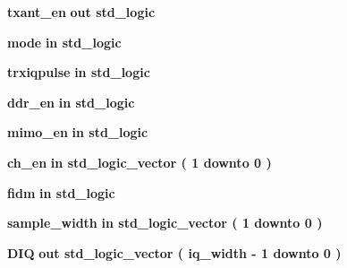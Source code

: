 \begin{DoxyCompactItemize}
\item 
{\bf txant\+\_\+en}  {\bfseries {\bfseries \textcolor{keywordflow}{out}\textcolor{vhdlchar}{ }}} {\bfseries \textcolor{comment}{std\+\_\+logic}\textcolor{vhdlchar}{ }} 
\item 
{\bf mode}  {\bfseries {\bfseries \textcolor{keywordflow}{in}\textcolor{vhdlchar}{ }}} {\bfseries \textcolor{comment}{std\+\_\+logic}\textcolor{vhdlchar}{ }} 
\item 
{\bf trxiqpulse}  {\bfseries {\bfseries \textcolor{keywordflow}{in}\textcolor{vhdlchar}{ }}} {\bfseries \textcolor{comment}{std\+\_\+logic}\textcolor{vhdlchar}{ }} 
\item 
{\bf ddr\+\_\+en}  {\bfseries {\bfseries \textcolor{keywordflow}{in}\textcolor{vhdlchar}{ }}} {\bfseries \textcolor{comment}{std\+\_\+logic}\textcolor{vhdlchar}{ }} 
\item 
{\bf mimo\+\_\+en}  {\bfseries {\bfseries \textcolor{keywordflow}{in}\textcolor{vhdlchar}{ }}} {\bfseries \textcolor{comment}{std\+\_\+logic}\textcolor{vhdlchar}{ }} 
\item 
{\bf ch\+\_\+en}  {\bfseries {\bfseries \textcolor{keywordflow}{in}\textcolor{vhdlchar}{ }}} {\bfseries \textcolor{comment}{std\+\_\+logic\+\_\+vector}\textcolor{vhdlchar}{ }\textcolor{vhdlchar}{(}\textcolor{vhdlchar}{ }\textcolor{vhdlchar}{ } \textcolor{vhdldigit}{1} \textcolor{vhdlchar}{ }\textcolor{keywordflow}{downto}\textcolor{vhdlchar}{ }\textcolor{vhdlchar}{ } \textcolor{vhdldigit}{0} \textcolor{vhdlchar}{ }\textcolor{vhdlchar}{)}\textcolor{vhdlchar}{ }} 
\item 
{\bf fidm}  {\bfseries {\bfseries \textcolor{keywordflow}{in}\textcolor{vhdlchar}{ }}} {\bfseries \textcolor{comment}{std\+\_\+logic}\textcolor{vhdlchar}{ }} 
\item 
{\bf sample\+\_\+width}  {\bfseries {\bfseries \textcolor{keywordflow}{in}\textcolor{vhdlchar}{ }}} {\bfseries \textcolor{comment}{std\+\_\+logic\+\_\+vector}\textcolor{vhdlchar}{ }\textcolor{vhdlchar}{(}\textcolor{vhdlchar}{ }\textcolor{vhdlchar}{ } \textcolor{vhdldigit}{1} \textcolor{vhdlchar}{ }\textcolor{keywordflow}{downto}\textcolor{vhdlchar}{ }\textcolor{vhdlchar}{ } \textcolor{vhdldigit}{0} \textcolor{vhdlchar}{ }\textcolor{vhdlchar}{)}\textcolor{vhdlchar}{ }} 
\item 
{\bf D\+IQ}  {\bfseries {\bfseries \textcolor{keywordflow}{out}\textcolor{vhdlchar}{ }}} {\bfseries \textcolor{comment}{std\+\_\+logic\+\_\+vector}\textcolor{vhdlchar}{ }\textcolor{vhdlchar}{(}\textcolor{vhdlchar}{ }\textcolor{vhdlchar}{ }\textcolor{vhdlchar}{ }\textcolor{vhdlchar}{ }{\bfseries {\bf iq\+\_\+width}} \textcolor{vhdlchar}{-\/}\textcolor{vhdlchar}{ } \textcolor{vhdldigit}{1} \textcolor{vhdlchar}{ }\textcolor{keywordflow}{downto}\textcolor{vhdlchar}{ }\textcolor{vhdlchar}{ } \textcolor{vhdldigit}{0} \textcolor{vhdlchar}{ }\textcolor{vhdlchar}{)}\textcolor{vhdlchar}{ }} 

\end{DoxyCompactItemize}

